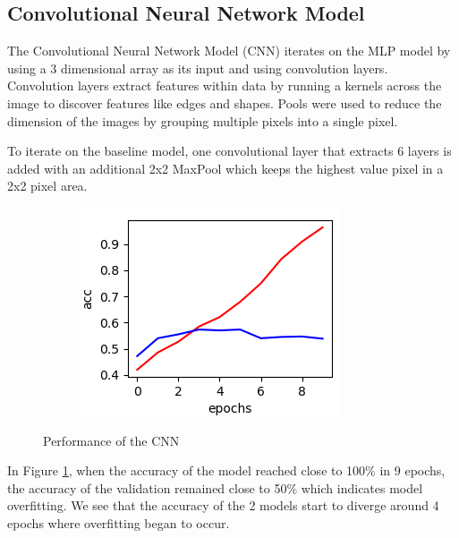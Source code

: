 \documentclass[../main.tex]{subfiles}
\begin{document}
\subsection{Convolutional Neural Network Model}

The Convolutional Neural Network Model (CNN) iterates on the MLP model by using a 3 dimensional array as its input and using convolution layers. Convolution layers extract features within data by running a kernels across the image to discover features like edges and shapes. Pools were used to reduce the dimension of the images by grouping multiple pixels into a single pixel. 

To iterate on the baseline model, one convolutional layer that extracts 6 layers is added with an additional 2x2 MaxPool which keeps the highest value pixel in a 2x2 pixel area.

\begin{figure}[h!]
  \centering
  \begin{subfigure}[b]{0.35\linewidth}
    \includegraphics[width=\linewidth]{cnn-performance.png}
  \end{subfigure}
  \caption{Performance of the CNN}
  \label{fig:cnn-performance}
\end{figure}

In Figure \ref{fig:cnn-performance}, when the accuracy of the model reached close to 100\% in 9 epochs, the accuracy of the validation remained close to 50\% which indicates model overfitting. We see that the accuracy of the 2 models start to diverge around 4 epochs where overfitting began to occur. 
\end{document}
